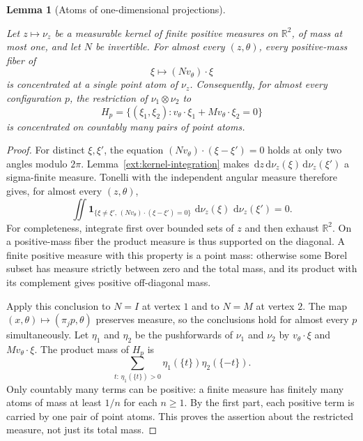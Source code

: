 \documentclass[11pt]{amsart}
\newcommand{\R}{\mathbb R}
\newcommand{\dd}{\,\mathrm d}
\newcommand{\one}{\mathbf 1}
\newtheorem{lemma}[theorem]{Lemma}
\theoremstyle{definition}
\theoremstyle{remark}
\numberwithin{equation}{section}
\providecommand{\lean}[1]{}
\providecommand{\leanok}{}
\begin{document}
\begin{lemma}[Atoms of one-dimensional projections]\label{ann:fibers}
\lean{Auto.annH,Auto.ann_fibers,Auto.ann_fibers_hyperplane}
\leanok
Let $z\mapsto\nu_z$ be a measurable kernel of finite positive
measures on $\R^2$, of mass at most one, and let $N$ be invertible.
For almost every $(z,\theta)$, every positive-mass fiber of
\[
 \xi\longmapsto (Nv_\theta)\cdot\xi
\]
is concentrated at a single point atom of $\nu_z$.
Consequently, for almost every configuration $p$, the restriction of
$\nu_1\otimes\nu_2$ to
\begin{equation}\label{ann:hyperplane}
 H_p=\{(\xi_1,\xi_2):
 v_\theta\cdot\xi_1+Mv_\theta\cdot\xi_2=0\}
\end{equation}
is concentrated on countably many pairs of point atoms.
\end{lemma}
\begin{proof}
For distinct $\xi,\xi'$, the equation
$(Nv_\theta)\cdot(\xi-\xi')=0$ holds at only two angles modulo
$2\pi$. Lemma~\ref{ext:kernel-integration} makes
$\dd z\dd\nu_z(\xi)\dd\nu_z(\xi')$ a sigma-finite measure.
Tonelli with the independent angular measure therefore gives, for almost every
$(z,\theta)$,
\[
 \iint\one_{\{\xi\ne\xi',\,
 (Nv_\theta)\cdot(\xi-\xi')=0\}}
 \,\dd\nu_z(\xi)\,\dd\nu_z(\xi')=0.
\]
For completeness, integrate first over bounded sets of $z$ and
then exhaust $\R^2$. On a positive-mass fiber the product measure
is thus supported on the diagonal. A finite positive measure
with this property is a point mass: otherwise some Borel subset
has measure strictly between zero and the total mass, and its
product with its complement gives positive off-diagonal mass.

Apply this conclusion to $N=I$ at vertex $1$ and to $N=M$ at
vertex $2$. The map $(x,\theta)\mapsto(\pi_jp,\theta)$ preserves
measure, so the conclusions hold for almost every $p$ simultaneously.
Let $\eta_1$ and $\eta_2$ be the pushforwards of $\nu_1$ and
$\nu_2$ by $v_\theta\cdot\xi$ and $Mv_\theta\cdot\xi$.
The product mass of $H_p$ is
\[
 \sum_{t:\,\eta_1(\{t\})>0}
 \eta_1(\{t\})\eta_2(\{-t\}).
\]
Only countably many terms can be positive: a finite measure has
finitely many atoms of mass at least $1/n$ for each $n\ge1$.
By the first part,
each positive term is carried by one pair of point atoms.
This proves the assertion about the restricted measure, not just
its total mass.
\end{proof}
\end{document}

